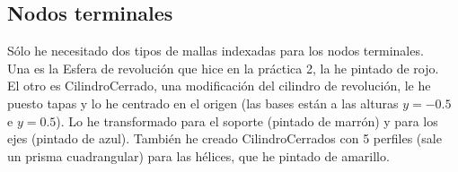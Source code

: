 \documentclass[12pt]{article}
\begin{document}
\subsection*{Nodos terminales}

Sólo he necesitado dos tipos de mallas indexadas para los nodos terminales. \\

Una es la Esfera de revolución que hice en la práctica 2, la he pintado de rojo. \\

El otro es CilindroCerrado, una modificación del cilindro de
revolución, le he puesto tapas y lo he centrado en el origen (las
bases están a las alturas $y=-0.5$ e $y=0.5$). Lo he transformado para
el soporte (pintado de marrón) y para los ejes (pintado de
azul). También he creado CilindroCerrados con 5 perfiles (sale
un prisma cuadrangular) para las hélices, que he pintado de amarillo.
\end{document}
